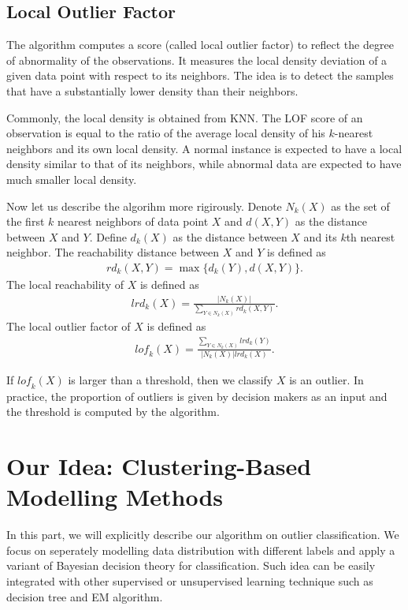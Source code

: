 \documentclass[english]{article}
\newenvironment{eqt}{\begin{equation}\begin{aligned}}{\end{aligned}\end{equation}}
\begin{document}
\subsection{Local Outlier Factor}
\par
The algorithm computes a score (called local outlier factor) to reflect the degree of abnormality of the observations. It measures the local density deviation of a given data point with respect to its neighbors. The idea is to detect the samples that have a substantially lower density than their neighbors.
\par
Commonly, the local density is obtained from KNN. The LOF score of an observation is equal to the ratio of the average local density of his $k$-nearest neighbors and its own local density. A normal instance is expected to have a local density similar to that of its neighbors, while abnormal data are expected to have much smaller local density.
\par
Now let us describe the algorihm more rigirously. Denote $N_k(X)$ as the set of the first $k$ nearest neighbors of data point $X$ and $d(X, Y)$ as the distance between $X$ and $Y$. Define $d_k(X)$ as the distance between $X$ and its $k$th nearest neighbor. The reachability distance between $X$ and $Y$ is defined as
\begin{eqt}
\textit{rd}_k(X, Y) = \max\{d_k(Y), d(X, Y)\}.
\end{eqt}
The local reachability of $X$ is defined as 
\begin{eqt}
\textit{lrd}_k(X) = \frac{|N_k(X)|}{\sum_{Y\in N_k(X)}\textit{rd}_k(X, Y)}.
\end{eqt}
The local outlier factor of $X$ is defined as 
\begin{eqt}
\textit{lof}_k(X) = \frac{\sum_{Y\in N_k(X)}\textit{lrd}_k(Y)}{|N_k(X)|\textit{lrd}_k(X)}.
\end{eqt}
\par
If $\textit{lof}_k(X)$ is larger than a threshold, then we classify $X$ is an outlier. In practice, the proportion of outliers is given by decision makers as an input and the threshold is computed by the algorithm. 


\section{Our Idea: Clustering-Based Modelling Methods}
\par
In this part, we will explicitly describe our algorithm on outlier classification. We focus on seperately modelling data distribution with different labels and apply a variant of Bayesian decision theory for classification. Such idea can be easily integrated with other supervised or unsupervised learning technique such as decision tree and EM algorithm.
\end{document}

